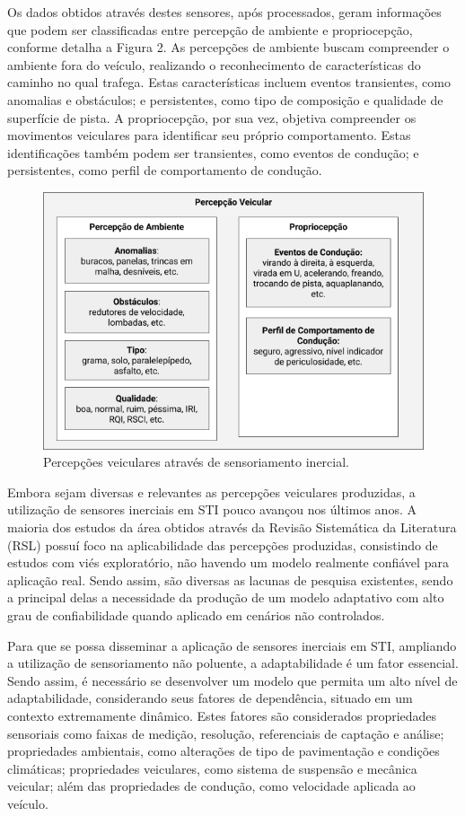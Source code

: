 Os dados obtidos através destes sensores, após processados, geram informações que podem ser classificadas entre percepção de ambiente e propriocepção, conforme detalha a Figura 2. As percepções de ambiente buscam compreender o ambiente fora do veículo, realizando o reconhecimento de características do caminho no qual trafega. Estas características incluem eventos transientes, como anomalias e obstáculos; e persistentes, como tipo de composição e qualidade de superfície de pista. A propriocepção, por sua vez, objetiva compreender os movimentos veiculares para identificar seu próprio comportamento. Estas identificações também podem ser transientes, como eventos de condução; e persistentes, como perfil de comportamento de condução.

\begin{figure}[t]
  \centering
  \caption{Percepções veiculares através de sensoriamento inercial.}
  \label{fig:percepcoes_veiculares}
  \includegraphics[width=0.9\linewidth]{figuras/fig1_1.png}
\end{figure}

Embora sejam diversas e relevantes as percepções veiculares produzidas, a utilização de sensores inerciais em STI pouco avançou nos últimos anos. A maioria dos estudos da área obtidos através da Revisão Sistemática da Literatura (RSL) possuí foco na aplicabilidade das percepções produzidas, consistindo de estudos com viés exploratório, não havendo um modelo realmente confiável para aplicação real. Sendo assim, são diversas as lacunas de pesquisa existentes, sendo a principal delas a necessidade da produção de um modelo adaptativo com alto grau de confiabilidade quando aplicado em cenários não controlados.

Para que se possa disseminar a aplicação de sensores inerciais em STI, ampliando a utilização de sensoriamento não poluente, a adaptabilidade é um fator essencial. Sendo assim, é necessário se desenvolver um modelo que permita um alto nível de adaptabilidade, considerando seus fatores de dependência, situado em um contexto extremamente dinâmico. Estes fatores são considerados propriedades sensoriais como faixas de medição, resolução, referenciais de captação e análise; propriedades ambientais, como alterações de tipo de pavimentação e condições climáticas; propriedades veiculares, como sistema de suspensão e mecânica veicular; além das propriedades de condução, como velocidade aplicada ao veículo.


